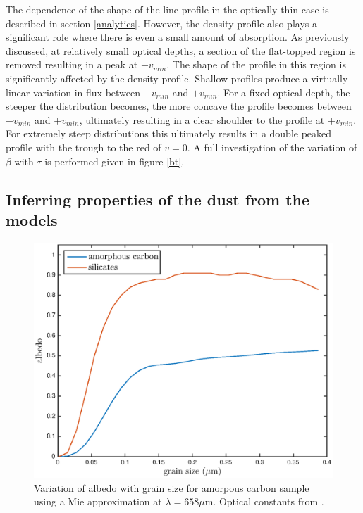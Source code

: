 \documentclass[useAMS,usenatbib,usegraphicx]{mnras}
\begin{document}
The dependence of the shape of the line profile in the optically thin case 
is described in section \ref{analytics}.  However, the density profile 
also plays a significant role where there is even a small amount of 
absorption.  As previously discussed, at relatively small optical depths, 
a section of the flat-topped region is removed resulting in a peak at 
$-v_{min}$.  The shape of the profile in this region is significantly 
affected by the density profile.  Shallow profiles produce a virtually 
linear variation in flux between $-v_{min}$ and $+v_{min}$.  For a fixed 
optical depth, the steeper the distribution becomes, the more concave the 
profile becomes between $-v_{min}$ and $+v_{min}$, ultimately resulting in 
a clear shoulder to the profile at $+v_{min}$.  For extremely steep 
distributions this ultimately results in a double peaked profile with the 
trough to the red of $v=0$.  A full investigation of the variation of 
$\beta$ with $\tau$ is performed given in figure \ref{bt}.

\subsection{Inferring properties of the dust from the models}

\begin{figure}
\begin{center}
\includegraphics[trim =37 10 45 15,clip=true,scale=0.51]{grainsize_albedo}
\caption{Variation of albedo with grain size for amorpous carbon sample 
using a Mie approximation at $\lambda = 658 \mu $m. Optical constants 
from \citet{Zubko1996}.}
\label{albedo_grain}
\end{center}
\end{figure}
\end{document}
